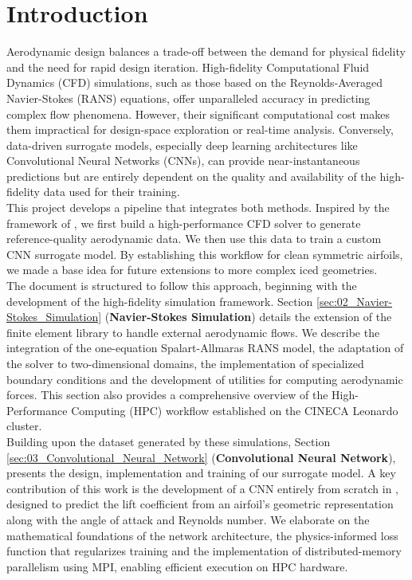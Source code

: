 \section{Introduction}
\label{sec:01_Introduction}

Aerodynamic design balances a trade-off between the demand for physical fidelity and the need for rapid design iteration. High-fidelity Computational Fluid Dynamics (CFD) simulations, such as those based on the Reynolds-Averaged Navier-Stokes (RANS) equations, offer unparalleled accuracy in predicting complex flow phenomena. However, their significant computational cost makes them impractical for design-space exploration or real-time analysis. Conversely, data-driven surrogate models, especially deep learning architectures like Convolutional Neural Networks (CNNs), can provide near-instantaneous predictions but are entirely dependent on the quality and availability of the high-fidelity data used for their training.\\

This project develops a pipeline that integrates both methods. Inspired by the framework of \citet{Cuozzo2026AIDriven}, we first build a high-performance CFD solver to generate reference-quality aerodynamic data. We then use this data to train a custom CNN surrogate model. By establishing this workflow for clean symmetric airfoils, we made a base idea for future extensions to more complex iced geometries.\\

The document is structured to follow this approach, beginning with the development of the high-fidelity simulation framework. Section \ref{sec:02_Navier-Stokes_Simulation} (\textbf{Navier-Stokes Simulation}) details the extension of the \textbf{\lifex} \cpp finite element library to handle external aerodynamic flows. We describe the integration of the one-equation Spalart-Allmaras RANS model, the adaptation of the solver to two-dimensional domains, the implementation of specialized boundary conditions and the development of utilities for computing aerodynamic forces. This section also provides a comprehensive overview of the High-Performance Computing (HPC) workflow established on the CINECA Leonardo cluster.\\

Building upon the dataset generated by these simulations, Section \ref{sec:03_Convolutional_Neural_Network} (\textbf{Convolutional Neural Network}), presents the design, implementation and training of our surrogate model. A key contribution of this work is the development of a CNN entirely from scratch in \cpp, designed to predict the lift coefficient from an airfoil's geometric representation along with the angle of attack and Reynolds number. We elaborate on the mathematical foundations of the network architecture, the physics-informed loss function that regularizes training and the implementation of distributed-memory parallelism using MPI, enabling efficient execution on HPC hardware.